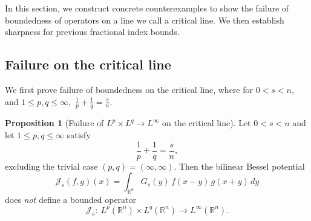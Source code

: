 \documentclass[12pt]{article}
\theoremstyle{definition}
\newtheorem{proposition}[theorem]{Proposition}
\theoremstyle{remark}
\numberwithin{equation}{section}
\begin{document}
In this section, we construct concrete counterexamples to show the failure of boundedness of operators on a line we call a critical line. We then establish sharpness for previous fractional index bounds.
\subsection{Failure on the critical line}
We first prove failure of boundedness on the critical line, where for $0<s<n,$ and $1\leq p,q\leq \infty,$ $\frac{1}{p}+\frac{1}{q}=\frac{s}{n}.$
\begin{proposition}[Failure of $L^p\times L^q\to L^\infty$ on the critical line]
\label{prop:fail-critical-Linfty}
Let $0<s<n$ and let $1\le p,q\le\infty$ satisfy
\begin{equation}\label{eq:critical-line}
\frac1p+\frac1q=\frac{s}{n},
\end{equation}
excluding the trivial case $(p,q)=(\infty,\infty)$.
Then the bilinear Bessel potential
\[
\mathcal{J}_s(f,g)(x)
=\int_{\mathbb R^n} G_s(y)\,f(x-y)\,g(x+y)\,dy
\]
does \emph{not} define a bounded operator
\[
\mathcal{J}_s:\ L^p(\mathbb R^n)\times L^q(\mathbb R^n)\longrightarrow L^\infty(\mathbb R^n).
\]
\end{proposition}
\end{document}
